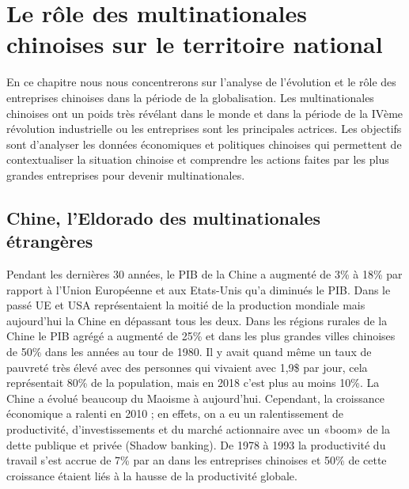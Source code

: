 \section{Le rôle des multinationales chinoises sur le territoire national}
En ce chapitre nous nous concentrerons sur l’analyse de l’évolution et le rôle des entreprises chinoises dans la période de la globalisation. Les multinationales chinoises ont un poids très révélant dans le monde et dans la période de la IVème révolution industrielle ou les entreprises sont les principales actrices. Les objectifs sont d’analyser les données économiques et politiques chinoises qui permettent de contextualiser la situation chinoise et comprendre les actions faites par les plus grandes entreprises pour devenir multinationales. 
\subsection{Chine, l'Eldorado des multinationales étrangères}
Pendant les dernières 30 années, le PIB de la Chine a augmenté de 3\% à 18\% par rapport à l’Union Européenne et aux Etats-Unis qu’a diminués le PIB. Dans le passé UE et USA représentaient la moitié de la production mondiale mais aujourd’hui la Chine en dépassant tous les deux. 
Dans les régions rurales de la Chine le PIB agrégé a augmenté de 25\% et dans les plus grandes villes chinoises de 50\% dans les années au tour de 1980.  Il y avait quand même un taux de pauvreté très élevé avec des personnes qui vivaient avec 1,9\$ par jour, cela représentait 80\% de la population, mais en 2018 c’est plus au moins 10\%. La Chine a évolué beaucoup du Maoisme à aujourd’hui. Cependant, la croissance économique a ralenti en 2010 ; en effets, on a eu un ralentissement de productivité, d’investissements et du marché actionnaire avec un «boom» de la dette publique et privée (Shadow banking). 
De 1978 à 1993 la productivité du travail s’est accrue de 7\% par an dans les entreprises chinoises et 50\% de cette croissance étaient liés à la hausse de la productivité globale.


